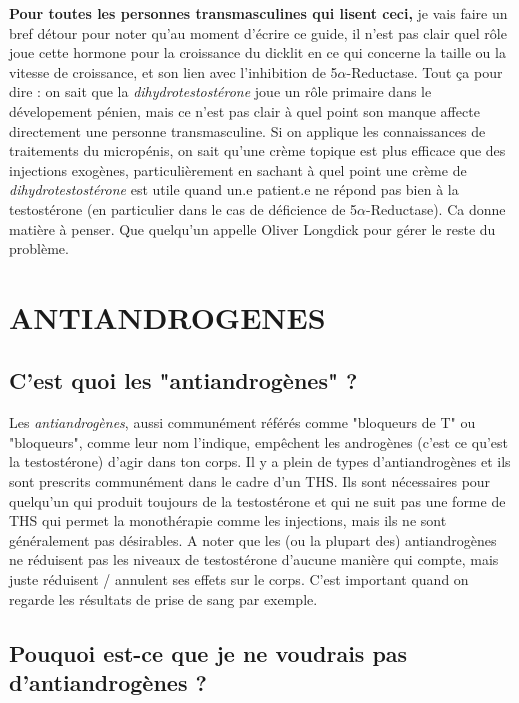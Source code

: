 \documentclass{article}
\begin{document}
\textbf{Pour toutes les personnes transmasculines qui lisent ceci,} je vais faire un bref détour pour noter qu'au moment d'écrire ce guide, il n'est pas clair quel rôle joue cette hormone pour la croissance du dicklit en ce qui concerne la taille ou la vitesse de croissance, et son lien avec l'inhibition de 5$\alpha$-Reductase. Tout ça pour dire : on sait que la \textit{dihydrotestostérone }joue un rôle primaire dans le dévelopement pénien, mais ce n'est pas clair à quel point son manque affecte directement une personne transmasculine. Si on applique les connaissances de traitements du micropénis, on sait qu'une crème topique est plus efficace que des injections exogènes, particulièrement en sachant à quel point une crème de \textit{dihydrotestostérone} est utile quand un.e patient.e ne répond pas bien à la testostérone (en particulier dans le cas de déficience de 5$\alpha$-Reductase). Ca donne matière à penser. Que quelqu'un appelle Oliver Longdick pour gérer le reste du problème. 

\section{ANTIANDROGENES}\label{AA}

\subsection{C'est quoi les "antiandrogènes" ?}

Les \textit{antiandrogènes}, aussi communément référés comme "bloqueurs de T" ou "bloqueurs", comme leur nom l'indique, empêchent les androgènes (c'est ce qu'est la testostérone) d'agir dans ton corps. Il y a plein de types d'antiandrogènes et ils sont prescrits communément dans le cadre d'un THS. Ils sont nécessaires pour quelqu'un qui produit toujours de la testostérone et qui ne suit pas une forme de THS qui permet la monothérapie comme les injections, mais ils ne sont généralement pas désirables. A noter que les (ou la plupart des) antiandrogènes ne réduisent pas les niveaux de testostérone d'aucune manière qui compte, mais juste réduisent / annulent ses effets sur le corps. C'est important quand on regarde les résultats de prise de sang par exemple.

\subsection{Pouquoi est-ce que je ne voudrais pas d'antiandrogènes ?}
\end{document}
